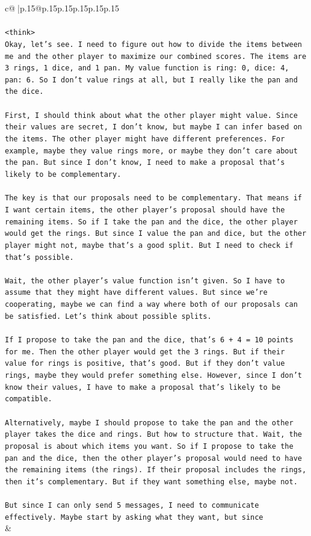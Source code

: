 \documentclass{article}
\begin{document}
{\begin{supertabular}{c@{$\;$}|p{.15\linewidth}@{}p{.15\linewidth}p{.15\linewidth}p{.15\linewidth}p{.15\linewidth}p{.15\linewidth}}
{{{\\ 
\\ 
\texttt{<think>} \\
\texttt{Okay, let's see. I need to figure out how to divide the items between me and the other player to maximize our combined scores. The items are 3 rings, 1 dice, and 1 pan. My value function is ring: 0, dice: 4, pan: 6. So I don't value rings at all, but I really like the pan and the dice.} \\
\\ 
\texttt{First, I should think about what the other player might value. Since their values are secret, I don't know, but maybe I can infer based on the items. The other player might have different preferences. For example, maybe they value rings more, or maybe they don't care about the pan. But since I don't know, I need to make a proposal that's likely to be complementary.} \\
\\ 
\texttt{The key is that our proposals need to be complementary. That means if I want certain items, the other player's proposal should have the remaining items. So if I take the pan and the dice, the other player would get the rings. But since I value the pan and dice, but the other player might not, maybe that's a good split. But I need to check if that's possible.} \\
\\ 
\texttt{Wait, the other player's value function isn't given. So I have to assume that they might have different values. But since we're cooperating, maybe we can find a way where both of our proposals can be satisfied. Let's think about possible splits.} \\
\\ 
\texttt{If I propose to take the pan and the dice, that's 6 + 4 = 10 points for me. Then the other player would get the 3 rings. But if their value for rings is positive, that's good. But if they don't value rings, maybe they would prefer something else. However, since I don't know their values, I have to make a proposal that's likely to be compatible.} \\
\\ 
\texttt{Alternatively, maybe I should propose to take the pan and the other player takes the dice and rings. But how to structure that. Wait, the proposal is about which items you want. So if I propose to take the pan and the dice, then the other player's proposal would need to have the remaining items (the rings). If their proposal includes the rings, then it's complementary. But if they want something else, maybe not.} \\
\\ 
\texttt{But since I can only send 5 messages, I need to communicate effectively. Maybe start by asking what they want, but since} \\
            }
        }
    }
    & \\ \\


\end{supertabular}}
\end{document}
